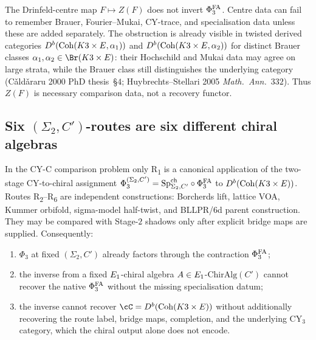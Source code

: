 \begin{proposition}
\label{prop:agent08-Z-still-many-to-one}
\ClaimStatusConditional{} The Drinfeld-centre map $F\mapsto Z(F)$ does
not invert $\Phi^{\mathrm{FA}}_3$. Centre data can fail to remember Brauer,
Fourier--Mukai, CY-trace, and specialisation data unless these are
added separately. The obstruction is already visible in twisted derived
categories
$D^b(\mathrm{Coh}(K3\times E,\alpha_1))$ and $D^b(\mathrm{Coh}(K3\times E,\alpha_2))$
for distinct Brauer classes $\alpha_1,\alpha_2\in\Br(K3\times E)$:
their Hochschild and Mukai data may agree on large strata, while the
Brauer class still distinguishes the underlying category
\textup{(}C\v{a}ld\v{a}raru 2000 PhD thesis~\S$4$;
Huybrechts--Stellari 2005 \emph{Math.\ Ann.}~$332$\textup{).} Thus
$Z(F)$ is necessary comparison data, not a recovery functor.
\end{proposition}

\subsection{Six \texorpdfstring{$(\Sigma_2,C')$}{Sigma2-C'}-routes are six different chiral algebras}
\label{wn:subsec:agent08-six-routes}

\begin{proposition}
\label{prop:agent08-six-routes}
\ClaimStatusTheorem{} In the CY-C comparison problem only
R\textsubscript{1} is a canonical application of the two-stage
CY-to-chiral assignment
$\Phi_3^{(\Sigma_2,C')}=\mathrm{Sp}^{\mathrm{ch}}_{\Sigma_2,C'}\circ\Phi^{\mathrm{FA}}_3$ to
$D^b(\mathrm{Coh}(K3\times E))$. Routes R\textsubscript{2}--R\textsubscript{6}
are independent constructions: Borcherds lift, lattice VOA, Kummer
orbifold, sigma-model half-twist, and BLLPR/6d parent construction.
They may be compared with Stage-$2$ shadows only after explicit
bridge maps are supplied. Consequently:
\begin{enumerate}[label=\textup{(\roman*)}]
 \item $\Phi_3$ at fixed $(\Sigma_2,C')$ already factors through the
 contraction $\Phi^{\mathrm{FA}}_3$;
 \item the inverse from a fixed $E_1$-chiral algebra
 $A\in E_1$-$\mathrm{ChirAlg}(C')$ cannot recover the native
 $\Phi^{\mathrm{FA}}_3$ without the missing specialisation datum;
 \item the inverse cannot recover $\cC=D^b(\Coh(K3\times E))$ without
 additionally recovering the route label, bridge maps, completion,
 and the underlying CY$_3$ category, which the chiral output alone
 does not encode.
\end{enumerate}
\end{proposition}

